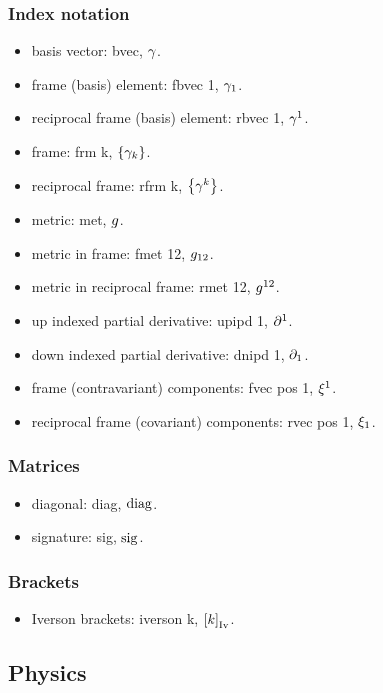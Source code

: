 \subsubsection{Index notation}
\begin{itemize}
\item basis vector: bvec, $\gamma$.
\item frame (basis) element: fbvec 1, $\gamma_{1}$.
\item reciprocal frame (basis) element: rbvec 1, $\gamma^{1}$.
\item frame: frm k, $\left\lbrace{\gamma_{k}}\right\rbrace$.
\item reciprocal frame: rfrm k, $\left\lbrace{\gamma^{k}}\right\rbrace$.
\item metric: met, $g$.
\item metric in frame: fmet 12, $g_{{1}{2}}$.
\item metric in reciprocal frame: rmet 12, $g^{{1}{2}}$.
\item up indexed partial derivative: upipd 1, $\partial^{1}$.
\item down indexed partial derivative: dnipd 1, $\partial_{1}$.
\item frame (contravariant) components: fvec pos 1, ${\xi}^{1}$.
\item reciprocal frame (covariant) components: rvec pos 1, ${\xi}_{1}$.
\end{itemize}


\subsubsection{Matrices}
\begin{itemize}
\item diagonal: diag, $\operatorname{diag}$.
\item signature: sig, $\operatorname{sig}$.
\end{itemize}


\subsubsection{Brackets}
\begin{itemize}
\item Iverson brackets: iverson k, $\left[{k}\right]_\text{Iv}$.
\end{itemize}


\subsection{Physics}


